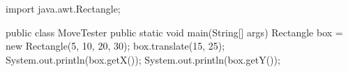 \begin{unipdcode}[language=Java]
import java.awt.Rectangle;

public class MoveTester {
    public static void main(String[] args) {
        Rectangle box = new Rectangle(5, 10, 20, 30);
        box.translate(15, 25);
        System.out.println(box.getX());
        System.out.println(box.getY());
    }
}
\end{unipdcode}
